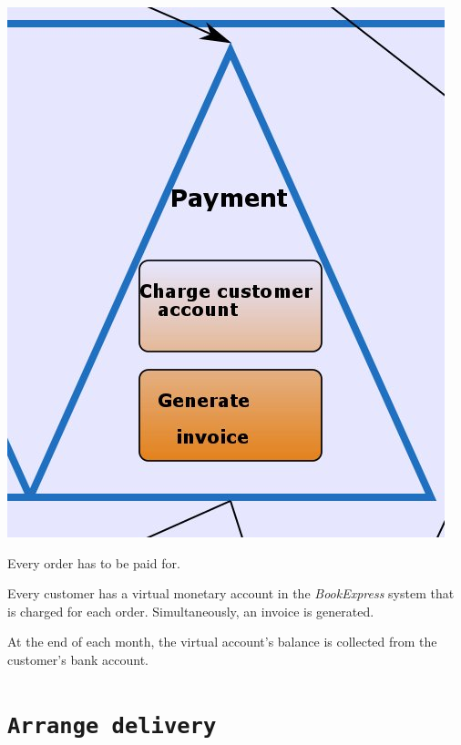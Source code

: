 \includegraphics[scale=0.8]{screenshots/Payment.jpeg}

Every order has to be paid for.

Every customer has a virtual monetary account in the \emph{BookExpress} system that is charged for each order. Simultaneously, an invoice
is generated.

At the end of each month, the virtual account's balance is collected from the customer's bank account.


\section{\texttt{Arrange delivery}}

